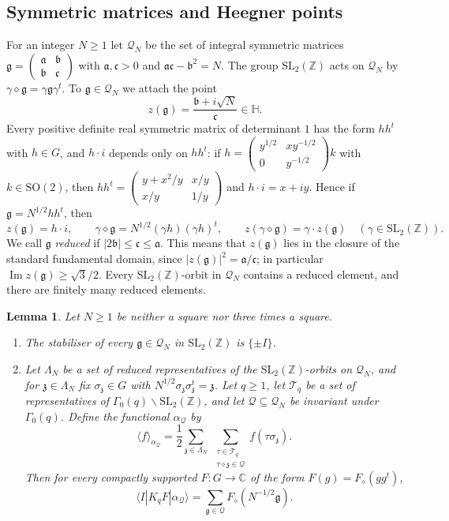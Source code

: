 \documentclass[11pt]{amsart}
\newtheorem{lemma}[theorem]{Lemma}
\theoremstyle{remark}
\theoremstyle{definition}
\numberwithin{equation}{section}
\newcommand{\Qc}{\mathcal{Q}}
\newcommand{\Tc}{\mathcal{T}}
\newcommand{\Z}{\mathbb{Z}}
\newcommand{\C}{\mathbb{C}}
\newcommand{\Hb}{\mathbb{H}}
\newcommand{\ga}{\mathfrak{a}}
\newcommand{\gb}{\mathfrak{b}}
\newcommand{\gc}{\mathfrak{c}}
\newcommand{\fg}{\mathfrak{g}}
\newcommand{\gz}{\mathfrak{z}}
\newcommand{\SL}{\mathrm{SL}}
\newcommand{\br}[1]{\langle #1\rangle}
\begin{document}
\subsection{Symmetric matrices and Heegner points}
For an integer $N\ge1$ let $\Qc_N$ be the set of integral symmetric matrices $\fg=\left(\begin{smallmatrix}\ga&\gb\\ \gb&\gc\end{smallmatrix}\right)$ with $\ga,\gc>0$ and $\ga\gc-\gb^2=N$. The group $\SL_2(\Z)$ acts on $\Qc_N$ by $\gamma\diamond\fg=\gamma\fg\gamma^{t}$. To $\fg\in\Qc_N$ we attach the point
\[
z(\fg)=\frac{\gb+i\sqrt N}{\gc}\in\Hb .
\]
Every positive definite real symmetric matrix of determinant $1$ has the form $hh^t$ with $h\in G$, and $h\cdot i$ depends only on $hh^t$: if $h=\left(\begin{smallmatrix}y^{1/2}&xy^{-1/2}\\0&y^{-1/2}\end{smallmatrix}\right)k$ with $k\in\mathrm{SO}(2)$, then $hh^t=\left(\begin{smallmatrix}y+x^2/y&x/y\\x/y&1/y\end{smallmatrix}\right)$ and $h\cdot i=x+iy$. Hence if $\fg=N^{1/2}hh^t$, then
\begin{equation}\label{eq:zg}
z(\fg)=h\cdot i,\qquad \gamma\diamond\fg=N^{1/2}(\gamma h)(\gamma h)^t,\qquad z(\gamma\diamond\fg)=\gamma\cdot z(\fg)\quad(\gamma\in\SL_2(\Z)).
\end{equation}
We call $\fg$ \emph{reduced} if $|2\gb|\le\gc\le\ga$. This means that $z(\fg)$ lies in the closure of the standard fundamental domain, since $|z(\fg)|^2=\ga/\gc$; in particular $\operatorname{Im}z(\fg)\ge\sqrt3/2$. Every $\SL_2(\Z)$-orbit in $\Qc_N$ contains a reduced element, and there are finitely many reduced elements.

\begin{lemma}\label{lem:param}
Let $N\ge1$ be neither a square nor three times a square.
\begin{enumerate}
\item[(a)] The stabiliser of every $\fg\in\Qc_N$ in $\SL_2(\Z)$ is $\{\pm I\}$.
\item[(b)] Let $\Lambda_N$ be a set of reduced representatives of the $\SL_2(\Z)$-orbits on $\Qc_N$, and for $\gz\in\Lambda_N$ fix $\sigma_\gz\in G$ with $N^{1/2}\sigma_\gz\sigma_\gz^t=\gz$. Let $q\ge1$, let $\Tc_q$ be a set of representatives of $\Gamma_0(q)\backslash\SL_2(\Z)$, and let $\Qc\subseteq\Qc_N$ be invariant under $\Gamma_0(q)$. Define the functional $\alpha_\Qc$ by
\[
\br{f}_{\alpha_\Qc}=\frac12\sum_{\gz\in\Lambda_N}\ \sum_{\substack{\tau\in\Tc_q\\ \tau\diamond\gz\in\Qc}}f(\tau\sigma_\gz).
\]
Then for every compactly supported $F:G\to\C$ of the form $F(g)=F_\diamond(gg^t)$,
\[
\br{I|K_qF|\alpha_\Qc}=\sum_{\fg\in\Qc}F_\diamond(N^{-1/2}\fg).
\]
\end{enumerate}
\end{lemma}
\end{document}
